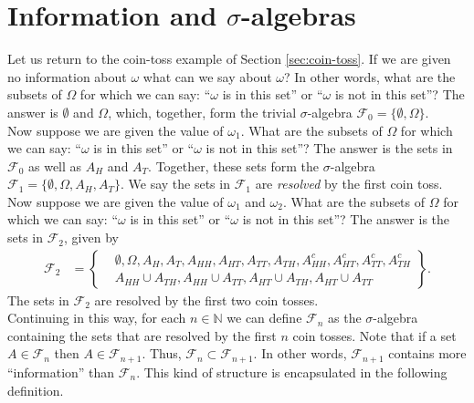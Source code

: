\documentclass[12pt]{book}
\numberwithin{equation}{chapter}
\theoremstyle{plain}
\numberwithin{theorem}{section}
\theoremstyle{definition}
\numberwithin{exercise}{chapter}
\newcommand{\<}{\langle}
\renewcommand{\>}{\rangle}
\renewcommand{\(}{\left(}
\renewcommand{\)}{\right)}
\renewcommand{\[}{\left[}
\renewcommand{\]}{\right]}
\newcommand\Nb{\mathds{N}}
\newcommand\Fc{\mathscr{F}}
\newcommand\om{\omega}
\newcommand\Om{\Omega}
\newcommand\sig{\sigma}
\begin{document}
\section{Information and $\sig$-algebras}
Let us return to the coin-toss example of Section \ref{sec:coin-toss}.  If we are given no information about $\om$ what can we say about $\om$?  In other words, what are the subsets of $\Om$ for which we can say: ``$\om$ is in this set'' or ``$\om$ is not in this set''?  The answer is $\emptyset$ and $\Om$, which, together, form the trivial $\sig$-algebra $\Fc_0 = \{\emptyset,\Om\}$.
\\[0.5em]
Now suppose we are given the value of $\om_1$.  What are the subsets of $\Om$ for which we can say: ``$\om$ is in this set'' or ``$\om$ is not in this set''?  The answer is the sets in $\Fc_0$ as well as $A_H$ and $A_T$.  Together, these sets form the $\sig$-algebra $\Fc_1 = \{ \emptyset, \Om, A_H, A_T \}$.  We say the sets in $\Fc_1$ are \emph{resolved} by the first coin toss.
\\[0.5em]
Now suppose we are given the value of $\om_1$ and $\om_2$.  What are the subsets of $\Om$ for which we can say: ``$\om$ is in this set'' or ``$\om$ is not in this set''?  The answer is the sets in $\Fc_2$, given by
\begin{align}
\Fc_2
	&=	\left\{ \begin{aligned} 
			&	\emptyset, \Om, A_H , A_T, A_{HH}, A_{HT}, A_{TT}, A_{TH}, A_{HH}^c , A_{HT}^c, A_{TT}^c, A_{TH}^c \\ 
			&	A_{HH} \cup A_{TH}, A_{HH} \cup A_{TT} , A_{HT} \cup A_{TH} , A_{HT} \cup A_{TT}
			\end{aligned} \right\} .
\end{align}
The sets in $\Fc_2$ are resolved by the first two coin tosses.
\\[0.5em]
Continuing in this way, for each $n \in \Nb$ we can define $\Fc_n$ as the $\sig$-algebra containing the sets that are resolved by the first $n$ coin tosses.  Note that if a set $A \in \Fc_n$ then $A \in \Fc_{n+1}$.  Thus, $\Fc_n \subset \Fc_{n+1}$.  In other words, $\Fc_{n+1}$ contains more ``information'' than $\Fc_n$.  This kind of structure is encapsulated in the following definition.
\end{document}
